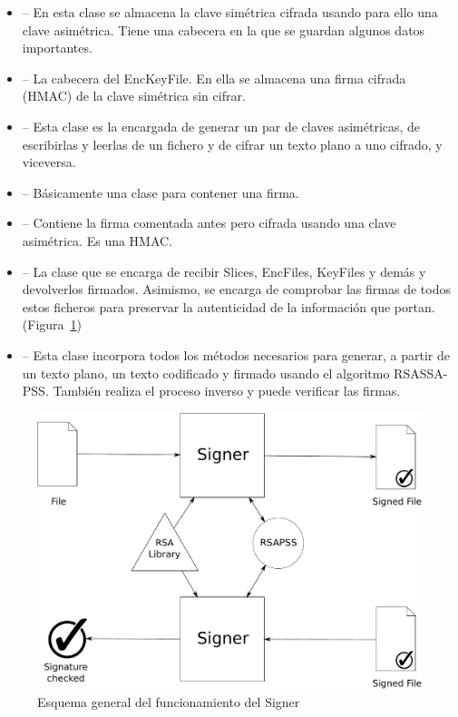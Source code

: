 \begin{itemize}
  \item {} -- En esta clase se almacena la clave simétrica
  cifrada usando para ello una clave asimétrica. Tiene una cabecera en la que
  se guardan algunos datos importantes.

  \item {} -- La cabecera del EncKeyFile. En ella se
  almacena una firma cifrada (HMAC) de la clave simétrica sin cifrar.

  \item {} -- Esta clase es la encargada de generar un par de
  claves asimétricas, de escribirlas y leerlas de un fichero y de cifrar
  un texto plano a uno cifrado, y viceversa.

  \item {} -- Básicamente una clase para contener una firma.

  \item {} -- Contiene la firma comentada antes pero
  cifrada usando una clave asimétrica. Es una HMAC.

  \item {} -- La clase que se encarga de recibir Slices, EncFiles,
  KeyFiles y demás y devolverlos firmados. Asimismo, se encarga de comprobar
  las firmas de todos estos ficheros para preservar la autenticidad de la
  información que portan. (Figura~\ref{fig:Signer})

  \item {} -- Esta clase incorpora todos los métodos necesarios
  para generar, a partir de un texto plano, un texto codificado y firmado
  usando el algoritmo RSASSA-PSS. También realiza el proceso inverso y puede
  verificar las firmas.
\end{itemize}

\begin{figure}[ht]
  \centering
  \includegraphics[scale=0.4]{Figures/Signer}
  \decoRule
  \caption[Signer]{Esquema general del funcionamiento del Signer}
  \label{fig:Signer}
\end{figure}

